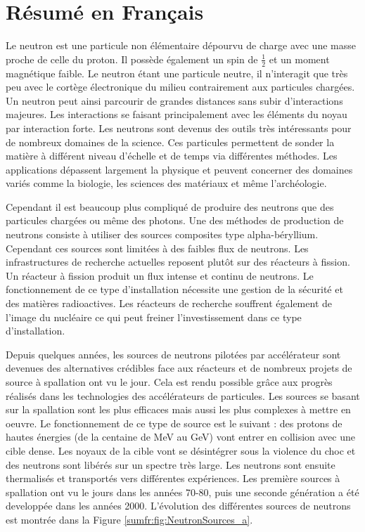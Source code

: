 \chapter*{Résumé en Français}
%

Le neutron est une particule non élémentaire dépourvu de charge avec une masse proche de celle du proton. Il possède également un spin de $\frac{1}{2}$ et un moment magnétique faible. Le neutron étant une particule neutre, il n'interagit que très peu avec le cortège électronique du milieu contrairement aux particules chargées. Un neutron peut ainsi parcourir de grandes distances sans subir d’interactions majeures. Les interactions se faisant principalement avec les éléments du noyau par interaction forte. Les neutrons sont devenus des outils très intéressants pour de nombreux domaines de la science. Ces particules permettent de sonder la matière à différent niveau d'échelle et de temps via différentes méthodes. Les applications dépassent largement la physique et peuvent concerner des domaines variés comme la biologie, les sciences des matériaux et même l'archéologie.

Cependant il est beaucoup plus compliqué de produire des neutrons que des particules chargées ou même des photons. Une des méthodes de production de neutrons consiste à utiliser des sources composites type alpha-béryllium. Cependant ces sources sont limitées à des faibles flux de neutrons. Les infrastructures de recherche actuelles reposent plutôt sur des réacteurs à fission. Un réacteur à fission produit un flux intense et continu de neutrons.
Le fonctionnement de ce type d’installation nécessite une gestion de la sécurité et des matières radioactives. Les réacteurs de recherche souffrent également de l’image du nucléaire ce qui peut freiner l’investissement dans ce type d’installation.

Depuis quelques années, les sources de neutrons pilotées par accélérateur sont devenues des alternatives crédibles face aux réacteurs et de nombreux projets de source à spallation ont vu le jour. Cela est rendu possible grâce aux progrès réalisés dans les technologies des accélérateurs de particules. Les sources se basant sur la spallation sont les plus efficaces mais aussi les plus complexes à mettre en oeuvre. Le fonctionnement de ce type de source est le suivant : des protons de hautes énergies (de la centaine de MeV au GeV) vont entrer en collision avec une cible dense. Les noyaux de la cible vont se désintégrer sous la violence du choc et des neutrons sont libérés sur un spectre très large. Les neutrons sont ensuite thermalisés et transportés vers différentes expériences. Les première sources à spallation ont vu le jours dans les années 70-80, puis une seconde génération a été developpée dans les années 2000. L'évolution des différentes sources de neutrons est montrée dans la Figure \ref{sumfr:fig:NeutronSources_a}.


